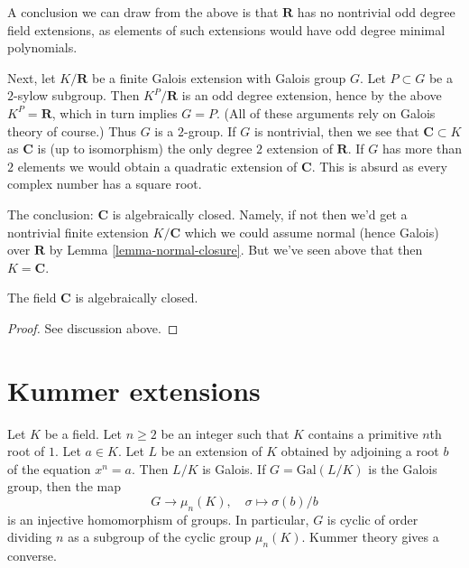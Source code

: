 \medskip\noindent
A conclusion we can draw from the above is that $\mathbf{R}$ has
no nontrivial odd degree field extensions, as elements of such extensions
would have odd degree minimal polynomials.

\medskip\noindent
Next, let $K/\mathbf{R}$ be a finite Galois extension with Galois group $G$.
Let $P \subset G$ be a $2$-sylow subgroup. Then $K^P/\mathbf{R}$ is an
odd degree extension, hence by the above $K^P = \mathbf{R}$,
which in turn implies
$G = P$. (All of these arguments rely on Galois theory of course.)
Thus $G$ is a $2$-group. If $G$ is nontrivial, then we see that
$\mathbf{C} \subset K$ as $\mathbf{C}$ is (up to isomorphism) the only
degree $2$ extension of $\mathbf{R}$. If $G$ has more than $2$ elements
we would obtain a quadratic extension of $\mathbf{C}$.
This is absurd as every complex number has a square root.

\medskip\noindent
The conclusion: $\mathbf{C}$ is algebraically closed. Namely, if not
then we'd get a nontrivial finite extension $K/\mathbf{C}$
which we could assume normal (hence Galois) over $\mathbf{R}$ by
Lemma \ref{lemma-normal-closure}. But we've seen above that then
$K = \mathbf{C}$.

\begin{lemma}
\label{lemma-C-algebraically-closed}
The field $\mathbf{C}$ is algebraically closed.
\end{lemma}

\begin{proof}
See discussion above.
\end{proof}





\section{Kummer extensions}
\label{section-Kummer}

\noindent
Let $K$ be a field. Let $n \geq 2$ be an integer such that $K$ contains
a primitive $n$th root of $1$. Let $a \in K$. Let $L$ be an extension
of $K$ obtained by adjoining a root $b$ of the equation $x^n = a$.
Then $L/K$ is Galois. If $G = \text{Gal}(L/K)$ is the Galois group, then
the map
$$
G \longrightarrow \mu_n(K),\quad \sigma \longmapsto \sigma(b)/b
$$
is an injective homomorphism of groups. In particular, $G$ is cyclic
of order dividing $n$ as a subgroup of the cyclic group $\mu_n(K)$.
Kummer theory gives a converse.

